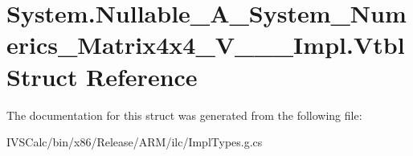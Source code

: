 \hypertarget{struct_system_1_1_nullable___a___system___numerics___matrix4x4___v_______impl_1_1_vtbl}{}\section{System.\+Nullable\+\_\+\+A\+\_\+\+System\+\_\+\+Numerics\+\_\+\+Matrix4x4\+\_\+\+V\+\_\+\+\_\+\+\_\+\+Impl.\+Vtbl Struct Reference}
\label{struct_system_1_1_nullable___a___system___numerics___matrix4x4___v_______impl_1_1_vtbl}


The documentation for this struct was generated from the following file\+:\begin{DoxyCompactItemize}
\item 
I\+V\+S\+Calc/bin/x86/\+Release/\+A\+R\+M/ilc/Impl\+Types.\+g.\+cs\end{DoxyCompactItemize}
